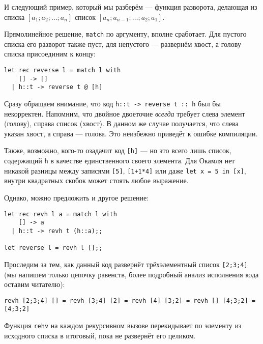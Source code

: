 И следующий пример, который мы разберём --- функция разворота, делающая из списка $[a_1;a_2;\dots;a_n]$
список $[a_n;a_{n-1};\dots;a_2;a_1]$.

Прямолинейное решение, \verb!match! по аргументу, вполне сработает.
Для пустого списка его разворот также пуст, для непустого --- развернём хвост, а голову списка
присоединим к концу:

\begin{verbatim}
let rec reverse l = match l with
    [] -> []
  | h::t -> reverse t @ [h]
\end{verbatim}

Сразу обращаем внимание, что код \verb!h::t -> reverse t :: h! был бы 
некорректен. Напомним, что двойное двоеточие \emph{всегда} требует слева элемент (голову),
справа список (хвост). В данном же случае получается, что слева указан хвост, а справа --- голова.
Это неизбежно приведёт к ошибке компиляции.

Также, возможно, кого-то озадачит код \verb![h]! --- но это всего лишь список, содержащий
\verb!h! в качестве единственного своего элемента. Для Окамля нет никакой разницы между
записями \verb![5]!, \verb![1+1*4]! или даже \verb!let x = 5 in [x]!, внутри квадратных 
скобок может стоять любое выражение.

Однако, можно предложить и другое решение:

\begin{verbatim}
let rec revh l a = match l with
    [] -> a
  | h::t -> revh t (h::a);;

let reverse l = revh l [];;
\end{verbatim}

Проследим за тем, как данный код развернёт трёхэлементный список \verb![2;3;4]!
(мы напишем только цепочку равенств, более подробный анализ исполнения кода оставим
читателю):

\begin{verbatim}
revh [2;3;4] [] = revh [3;4] [2] = revh [4] [3;2] = revh [] [4;3;2] = [4;3;2]
\end{verbatim}

Функция \verb!rehv! на каждом рекурсивном вызове перекидывает
по элементу из исходного списка в итоговый, пока не развернёт его целиком. 
